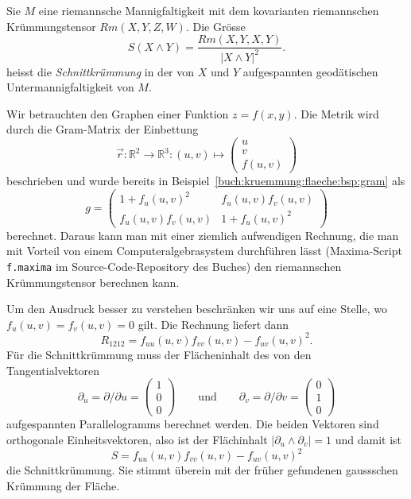 \begin{definition}[Schnittkrümmung]
\label{buch:kruemmung:schnittkruemmung:def:schnittkruemmung}
Sie $M$ eine riemannsche Mannigfaltigkeit mit dem kovarianten riemannschen
Krümmungstensor $Rm(X,Y,Z,W)$.
Die Grösse
\[
S(X\wedge Y) = \frac{Rm(X,Y,X,Y)}{|X\wedge Y|^2}.
\]
heisst die \emph{Schnittkrümmung} in der von $X$ und $Y$ aufgespannten
geodätischen Untermannigfaltigkeit von $M$.
%
\end{definition}

\begin{beispiel}
Wir betrauchten den Graphen einer Funktion $z=f(x,y)$.
Die Metrik wird 
durch die Gram-Matrix der Einbettung
\[
\vec{r}
\colon
\mathbb{R}^2 \to \mathbb{R}^3
:
(u,v)
\mapsto 
\begin{pmatrix} u \\ v \\ f(u,v) \end{pmatrix}
\]
beschrieben und wurde bereits in
Beispiel~\ref{buch:kruemmung:flaeche:bsp:gram}
als
\[
g
=
\begin{pmatrix}
1 + f_u(u,v)^2    & f_u(u,v) f_v(u,v) \\
f_u(u,v) f_v(u,v) & 1 + f_u(u,v)^2
\end{pmatrix}
\]
berechnet.
Daraus kann man mit einer ziemlich aufwendigen Rechnung, die man
mit Vorteil von einem Computeralgebrasystem durchführen lässt
(Maxima-Script \texttt{f.maxima} im Source-Code-Repository des Buches)
den riemannschen Krümmungstensor berechnen kann.

Um den Ausdruck besser zu verstehen beschränken wir uns auf eine Stelle,
wo $f_u(u,v)=f_v(u,v)=0$ gilt.
Die Rechnung liefert dann
\[
R_{1212} = f_{uu}(u,v) f_{vv}(u,v) - f_{uv}(u,v)^2.
\]
Für die Schnittkrümmung muss der Flächeninhalt des von den Tangentialvektoren
\[
\partial_u
=
\partial/\partial u
=
\begin{pmatrix}1\\0\\0\end{pmatrix}
\qquad\text{und}\qquad
\partial_v
=
\partial/\partial v
=
\begin{pmatrix}0\\1\\0\end{pmatrix}
\]
aufgespannten Parallelogramms berechnet werden.
Die beiden Vektoren sind orthogonale Einheitsvektoren, also ist
der Flächinhalt $|\partial_u\wedge\partial_v|=1$ und damit ist
\[
S
=
f_{uu}(u,v) f_{vv}(u,v) - f_{uv}(u,v)^2
\]
die Schnittkrümmung.
Sie stimmt überein mit der früher gefundenen gaussschen Krümmung
der Fläche.
\end{beispiel}

